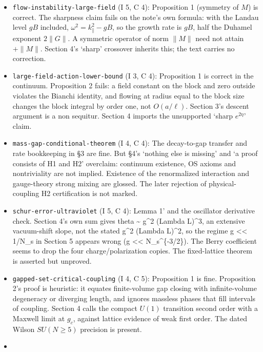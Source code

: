 \documentclass[11pt,a4paper]{article}
\newcommand{\tightlist}{\setlength{\itemsep}{0pt}\setlength{\parskip}{0pt}}
\begin{document}
\begin{itemize}
\tightlist
\item
  \texttt{flow-instability-large-field} (I 5, C 4): Proposition 1
  (symmetry of \(M\)) is correct. The sharpness claim fails on the
  note's own formula: with the Landau level \(gB\) included,
  \(\omega^2=k_\parallel^2-gB\), so the growth rate is \(gB\), half the
  Duhamel exponent \(2\|G\|\). A symmetric operator of norm \(\|M\|\)
  need not attain \(+\|M\|\). Section 4's `sharp' crossover inherits
  this; the text carries no correction.
\item
  \texttt{large-field-action-lower-bound} (I 3, C 4): Proposition 1 is
  correct in the continuum. Proposition 2 fails: a field constant on the
  block and zero outside violates the Bianchi identity, and flowing at
  radius equal to the block size changes the block integral by order
  one, not \(O(a/\ell)\). Section 3's descent argument is a non
  sequitur. Section 4 imports the unsupported `sharp \(e^{2\eta}\)'
  claim.
\item
  \texttt{mass-gap-conditional-theorem} (I 4, C 4): The decay-to-gap
  transfer and rate bookkeeping in §3 are fine. But §4's `nothing else
  is missing' and `a proof consists of H1 and H2' overclaim: continuum
  existence, OS axioms and nontriviality are not implied. Existence of
  the renormalized interaction and gauge-theory strong mixing are
  glossed. The later rejection of physical-coupling H2 certification is
  not marked.
\item
  \texttt{schur-error-ultraviolet} (I 5, C 4): Lemma 1' and the
  oscillator derivative check. Section 4's own sum gives theta
  \textasciitilde{} g\^{}2 (Lambda L)\^{}3, an extensive vacuum-shift
  slope, not the stated g\^{}2 (Lambda L)\^{}2, so the regime g
  \textless\textless{} 1/N\_s in Section 5 appears wrong (g
  \textless\textless{} N\_s\^{}\{-3/2\}). The Berry coefficient seems to
  drop the four charge/polarization copies. The fixed-lattice theorem is
  asserted but unproved.
\item
  \texttt{gapped-set-critical-coupling} (I 4, C 5): Proposition 1 is
  fine. Proposition 2's proof is heuristic: it equates finite-volume gap
  closing with infinite-volume degeneracy or diverging length, and
  ignores massless phases that fill intervals of coupling. Section 4
  calls the compact \(U(1)\) transition second order with a Maxwell
  limit at \(g_c\), against lattice evidence of weak first order. The
  dated Wilson \(SU(N\ge5)\) precision is present.
\item

\end{itemize}
\end{document}

